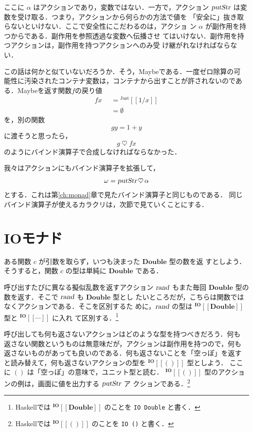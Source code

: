 \documentclass[a5paper,twoside,fleqn,draft]{jsbook}
\def\[{[\![}
\def\]{]\!]}
\newcommand{\programminglanguage}[1]{\textsf{#1}}
\newcommand{\haskell}{\programminglanguage{Haskell}}
\newcommand{\code}[1]{\texttt{#1}}
\newcommand{\mKeyword}[1]{\mathsf{#1}}
\newcommand{\mOtherwiseKeyword}{\mKeyword{otherwise}}
\DeclareMathOperator{\mOtherwise}{\mOtherwiseKeyword}
\newcommand{\mNothing}{\emptyset}
\newcommand{\mAction}[1]{\textsl{#1}}
\DeclareMathOperator{\mPutStr}{\mAction{putStr}}
\DeclareMathOperator{\mRand}{\mAction{rand}}
\DeclareMathOperator{\mBind}{\heartsuit}
\newcommand{\mType}[1]{\mathbf{#1}} %
\newcommand{\mDoubleType}{\mType{Double}}
\newcommand{\mUnitType}{\mType{()}}
\newcommand{\mTypeAssemble}[2]{{}^\mType{#1}\[\mType{#2}\]}
\newcommand{\mIOType}[1]{\mTypeAssemble{IO}{#1}}
\newcommand{\mIODoubleType}{\mIOType{\mDoubleType}}
\newcommand{\mIOUnitType}{\mIOType{\mUnitType}}
\newcommand{\mValueConstructor}[1]{\mathrm{#1}}
\newcommand{\mValueWith}[2]{{}^\mValueConstructor{#1}\[#2\]}
\newcommand{\mJustWith}[1]{\mValueWith{Just}{#1}}
\newcommand{\mGuard}[1]{\mathop{\mid_{#1}}}
\begin{document}
ここに $\alpha$ はアクションであり，変数ではない．一方で，アクション
$\mPutStr$ は変数を受け取る．つまり，アクションから何らかの方法で値を
「安全に」抜き取らないといけない．ここで安全性にこだわるのは，アクショ
ン $\alpha$ が副作用を持つからである．副作用を参照透過な変数へ伝播させ
てはいけない．副作用を持つアクションは，副作用を持つアクションへのみ受
け継がれなければならない．

この話は何かと似ていないだろうか．そう，Maybeである．一度ゼロ除算の可
能性に汚染されたコンテナ変数は，コンテナから出すことが許されないのであ
る．Maybeを返す関数$f$の戻り値
\begin{equation}
  \begin{aligned}
    fx&\mGuard{x\neq0}=\mJustWith{1/x}\\
    &\mGuard{\mOtherwise}=\mNothing
  \end{aligned}
\end{equation}
を，別の関数
\begin{equation}
  gy=1+y
\end{equation}
に渡そうと思ったら，
\begin{equation}
  g\mBind fx
\end{equation}
のようにバインド演算子で合成しなければならなかった．

我々はアクションにもバインド演算子を拡張して，
\begin{equation}
  \omega=\mPutStr\mBind\alpha
\end{equation}
とする．これは第\ref{ch:monad}章で見たバインド演算子と同じものである．
同じバインド演算子が使えるカラクリは，次節で見ていくことにする．

\section{IOモナド}

ある関数 $c$ が引数を取らず，いつも決まった $\mDoubleType$ 型の数を返
すとしよう．そうすると，関数 $c$ の型は単純に $\mDoubleType$ である．

呼び出すたびに異なる擬似乱数を返すアクション $\mRand$ もまた毎回
$\mDoubleType$ 型の数を返す．そこで $\mRand$ も $\mDoubleType$ 型とし
たいところだが，こちらは関数ではなくアクションである．そこを区別するた
めに，$\mRand$ の型は $\mIODoubleType$ 型と $\mIOType{\dotsb}$ に入れ
て区別する．\footnote{\haskell では $\mIODoubleType$ のことを \code{IO
Double} と書く．}

呼び出しても何も返さないアクションはどのような型を持つべきだろう．何も
返さない関数というものは無意味だが，アクションは副作用を持つので，何も
返さないものがあっても良いのである．何も返さないことを「空っぽ」を返す
と読み替えて，何も返さないアクションの型を $\mIOUnitType$ 型としよう．
ここに $\mUnitType$ は「空っぽ」の意味で，ユニット型と読む．
$\mIOUnitType$ 型のアクションの例は，画面に値を出力する $\mPutStr$ ア
クションである．\footnote{\haskell では $\mIOUnitType$ のことを
  \code{IO ()} と書く．}
\end{document}
